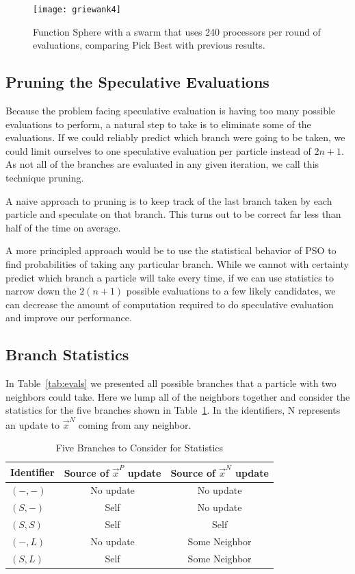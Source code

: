 \documentclass[journal,letterpaper]{IEEEtran}
\providecommand{\pers}{\ensuremath{P}}
\providecommand{\neigh}{\ensuremath{N}}
\providecommand{\leftind}{\ensuremath{L}}
\providecommand{\nbest}{\ensuremath{\Vec{x}^\neigh}}
\providecommand{\pbest}{\ensuremath{\Vec{x}^\pers}}
\providecommand{\casexn}{\ensuremath{(S,-)}}
\providecommand{\casexx}{\ensuremath{(S,S)}}
\providecommand{\casexl}{\ensuremath{(S,\leftind)}}
\providecommand{\casepn}{\ensuremath{(-,-)}}
\providecommand{\casepl}{\ensuremath{(-,\leftind)}}
\begin{document}
\begin{figure}
  \centering
  \texttt{[image: griewank4]}
  \caption{Function Sphere with a swarm that uses 240 processors per round of
  evaluations, comparing Pick Best with previous results.}
  \label{fig:griewank-pickbest}
\end{figure}

\subsection{Pruning the Speculative Evaluations}
\label{sec:pruning}

Because the problem facing speculative evaluation is having too many possible
evaluations to perform, a natural step to take is to eliminate some of the
evaluations.  If we could reliably predict which branch were going to be taken,
we could limit ourselves to one speculative evaluation per particle instead of
$2n+1$.  As not all of the branches are evaluated in any given iteration, we
call this technique pruning.  

A naive approach to pruning is to keep track of the last branch taken by each
particle and speculate on that branch.  This turns out to be correct far less
than half of the time on average.

A more principled approach would be to use the statistical behavior of PSO to
find probabilities of taking any particular branch.  While we cannot with
certainty predict which branch a particle will take every time, if we can use
statistics to narrow down the $2(n+1)$ possible evaluations to a few likely
candidates, we can decrease the amount of computation required to do
speculative evaluation and improve our performance.

\subsection{Branch Statistics}

In Table~\ref{tab:evals} we presented all possible branches that a particle
with two neighbors could take.  Here we lump all of the neighbors together and
consider the statistics for the five branches shown in
Table~\ref{tab:branches}.  In the identifiers, N represents an update to
$\nbest$ coming from any neighbor.

\begin{table}[ht]
  \caption{Five Branches to Consider for Statistics}
  \label{tab:branches}
  \centering
  \begin{tabular}{lcc}
	Identifier&Source of $\pbest$ update&Source of $\nbest$ update\\
	\hline
	\hline
	$\casepn$&No update&No update\\
	\hline
	$\casexn$&Self&No update\\
	\hline
	$\casexx$&Self&Self\\
	\hline
	$\casepl$&No update&Some Neighbor\\
	\hline
	$\casexl$&Self&Some Neighbor\\
	\hline
  \end{tabular}
\end{table}
\end{document}
